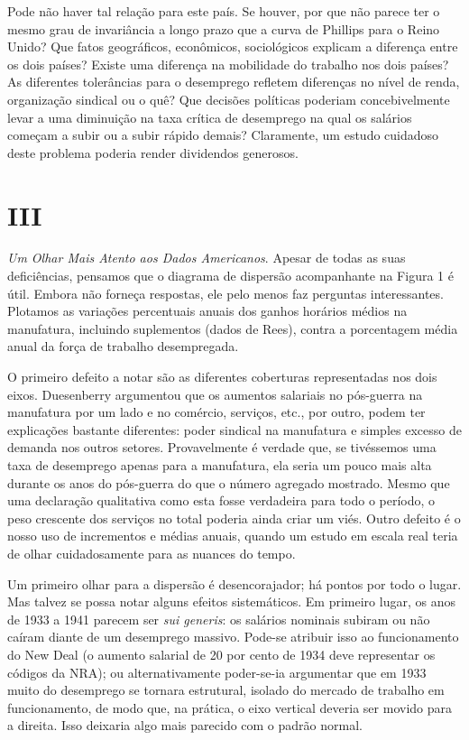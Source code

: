 \documentclass[12pt]{article}
\begin{document}
Pode não haver tal relação para este país. Se houver, por que não parece ter o mesmo grau de invariância a longo prazo que a curva de Phillips para o Reino Unido? Que fatos geográficos, econômicos, sociológicos explicam a diferença entre os dois países? Existe uma diferença na mobilidade do trabalho nos dois países? As diferentes tolerâncias para o desemprego refletem diferenças no nível de renda, organização sindical ou o quê? Que decisões políticas poderiam concebivelmente levar a uma diminuição na taxa crítica de desemprego na qual os salários começam a subir ou a subir rápido demais? Claramente, um estudo cuidadoso deste problema poderia render dividendos generosos.

\section*{III}

\textit{Um Olhar Mais Atento aos Dados Americanos}. Apesar de todas as suas deficiências, pensamos que o diagrama de dispersão acompanhante na Figura 1 é útil. Embora não forneça respostas, ele pelo menos faz perguntas interessantes. Plotamos as variações percentuais anuais dos ganhos horários médios na manufatura, incluindo suplementos (dados de Rees), contra a porcentagem média anual da força de trabalho desempregada.

O primeiro defeito a notar são as diferentes coberturas representadas nos dois eixos. Duesenberry argumentou que os aumentos salariais no pós-guerra na manufatura por um lado e no comércio, serviços, etc., por outro, podem ter explicações bastante diferentes: poder sindical na manufatura e simples excesso de demanda nos outros setores. Provavelmente é verdade que, se tivéssemos uma taxa de desemprego apenas para a manufatura, ela seria um pouco mais alta durante os anos do pós-guerra do que o número agregado mostrado. Mesmo que uma declaração qualitativa como esta fosse verdadeira para todo o período, o peso crescente dos serviços no total poderia ainda criar um viés. Outro defeito é o nosso uso de incrementos e médias anuais, quando um estudo em escala real teria de olhar cuidadosamente para as nuances do tempo.

Um primeiro olhar para a dispersão é desencorajador; há pontos por todo o lugar. Mas talvez se possa notar alguns efeitos sistemáticos. Em primeiro lugar, os anos de 1933 a 1941 parecem ser \textit{sui generis}: os salários nominais subiram ou não caíram diante de um desemprego massivo. Pode-se atribuir isso ao funcionamento do New Deal (o aumento salarial de 20 por cento de 1934 deve representar os códigos da NRA); ou alternativamente poder-se-ia argumentar que em 1933 muito do desemprego se tornara estrutural, isolado do mercado de trabalho em funcionamento, de modo que, na prática, o eixo vertical deveria ser movido para a direita. Isso deixaria algo mais parecido com o padrão normal.
\end{document}
